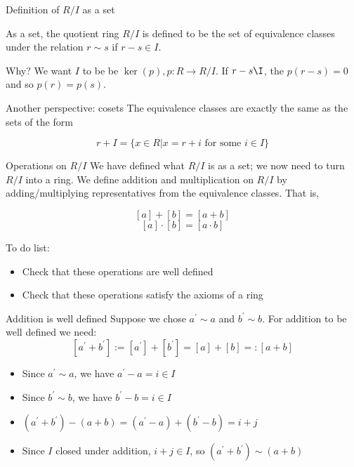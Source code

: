 \documentclass{beamer}
\begin{document}
\begin{frame}{Definition of $R/I$ as a set}

As a set, the quotient ring $R/I$ is defined to be the set of equivalence classes under the relation $r\sim s$ if $r-s\in I$.

\begin{block}{Why?}
We want $I$ to be be $\ker(p), p:R\to R/I$.  If $r-s\I$, the $p(r-s)=0$ and so $p(r)=p(s)$.  
\end{block}
\begin{block}{Another perspective: cosets}
  The equivalence classes are exactly the same as the sets of the form

  $$r+I=\{x\in R | x=r+i \text{ for some } i\in I\}$$
  \end{block}

\end{frame}


\begin{frame}{Operations on $R/I$}
We have defined what $R/I$ is as a set; we now need to turn $R/I$ into a ring.  We define addition and multiplication on $R/I$ by adding/multiplying representatives from the equivalence classes.  That is, 

$$[a]+[b]=[a+b]$$
$$[a]\cdot [b]=[a\cdot b]$$

\begin{block}{To do list:}
\begin{itemize}
\item Check that these operations are well defined
\item Check that these operations satisfy the axioms of a ring
\end{itemize}
\end{block}

\end{frame}

\begin{frame}{Addition is well defined}
Suppose we chose $a^\prime\sim a$ and $b^\prime \sim b$.  For addition to be well defined we need:
$$[a^\prime+b^\prime]:=[a^\prime]+[b^\prime]=[a]+[b]=:[a+b]$$

\begin{itemize}
\item Since $a^\prime \sim a$, we have $a^\prime-a=i\in I$
\item Since $b^\prime \sim b$, we have $b^\prime-b=i\in I$ 
\item $(a^\prime+b^\prime)-(a+b)=(a^\prime-a)+(b^\prime-b)=i+j$
\item Since $I$ closed under addition, $i+j\in I$, so $(a^\prime+b^\prime)\sim (a+b)$
\end{itemize}

\end{frame}
\end{document}
